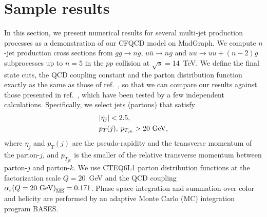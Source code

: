 \section{Sample results}
\label{result}
In this section, we present numerical results for several
 multi-jet production processes as a demonstration of our
 CFQCD model on MadGraph. We compute $n$-jet production cross sections from
 $gg\rightarrow ng$, $u\overline{u}\rightarrow ng$ and
 $uu\rightarrow uu+(n-2)g$ subprocesses
 up to $n=5$ in the $pp$ collision at $\sqrt{s}=14$~TeV.
 We define the final state cuts, the QCD coupling constant
 and the parton distribution function exactly as the same
 as those of ref.~\cite{GPU2}, so that we can compare our results
 against those presented in ref.~\cite{GPU2}, which have been
 tested by a few independent calculations.
 Specifically, we select jets (partons) that satisfy
 \begin{subequations}
  \begin{align}
 \label{jet-cuts}
 &|\eta_j| < 2.5,\\
   &p_T(j),\: p_{T_{jk}} > 20~{\mbox{\rm GeV}},
 \end{align}
 \end{subequations}
 where $\eta_j$ and $p_T(j)$ are the pseudo-rapidity and
 the transverse momentum of the parton-$j$,
 and $p_{T_{jk}}$ is the smaller of the relative transverse
 momentum between parton-$j$ and parton-$k$.
 We use CTEQ6L1 parton distribution functions\cite{CTEQ6L1}
 at the factorization scale $Q=20$~GeV and the QCD coupling
 $\alpha_s(Q=20~{\rm GeV})_{\overline{{\rm MS}}}=0.171$.
 Phase space integration and summation over color and helicity
 are performed by an adaptive Monte Carlo (MC) integration
 program BASES\cite{BASES}.

